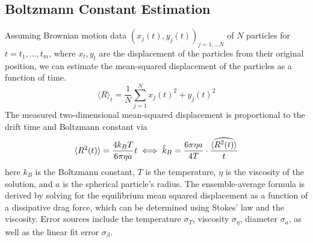\documentclass[aps,prb,twocolumn,superscriptaddress,floatfix,longbibliography,citeautoscript]{revtex4-2}
\begin{document}
\subsection{Boltzmann Constant Estimation \label{sec:BoltzTheory}}
Assuming Brownian motion data $(x_j(t), y_j(t))_{j=1, \dots N}$ of $N$ particles for $t=t_1, \dots, t_m$, 
where $x_t, y_t$ are the displacement of the particles from their original position, 
we can estimate the mean-squared displacement of the particles as a function of time. 
\begin{equation}
    \langle R\rangle_t = \dfrac 1 N \sum_{j=1}^N x_j(t)^2 + y_j(t)^2 
\end{equation}
The measured two-dimensional mean-squared displacement is proportional to the drift time and Boltzmann constant via \citep[see][Eq. 3]{nakroshis2003measuring} 
\begin{equation}
    \langle R^2(t)\rangle = \dfrac{4k_B T}{6\pi \eta a}t \iff \hat k_B = \dfrac{6\pi \eta a}{4T} \cdot \widehat{\dfrac{\langle R^2(t)\rangle}{t}} 
    \label{eq:bolzCalc}
\end{equation}
here $k_B$ is the Boltzmann constant, $T$ is the temperature, $\eta$ is the viscosity of the solution, and 
$a$ is the spherical particle's radius. The ensemble-average formula is derived by solving for the equilibrium
mean squared displacement as a function of a dissipative drag force, which can be determined using Stokes' law
and the viscosity. Error sources include the temperature $\sigma_T$, viscosity $\sigma_\eta$, diameter $\sigma_a$, 
as well as the linear fit error $\sigma_\beta$. 
\end{document}
